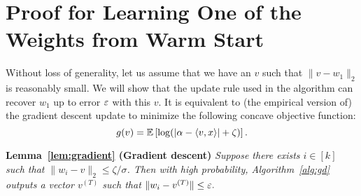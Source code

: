 \section{Proof for Learning One of the Weights from Warm Start} \label{sec:proof_gd}


Without loss of generality, let us assume that we have an $v$ such that $\| v - w_1 \|_2$ is reasonably small. We will show that the update rule used in the algorithm can recover $w_1$ up to error $\varepsilon$ with this $v$. 
%
It is equivalent to (the empirical version of) the gradient descent update to minimize the following concave objective function:
$$
  g(v) = \mathbb{E} \left [\log (|\alpha - \langle v, x \rangle| + \zeta)  \right].
$$





\medskip
\noindent
\textbf{Lemma~\ref{lem:gradient} (Gradient descent)}
{\it
Suppose there exists $i \in [k]$ such that $\| w_i - v \|_2 \le \zeta / \sigma$. Then with high probability, Algorithm~\ref{alg:gd} outputs a vector $v^{(T)}$ such that
$
  \| w_{i} - v^{(T)} \| \le \varepsilon.
$
}
\medskip

